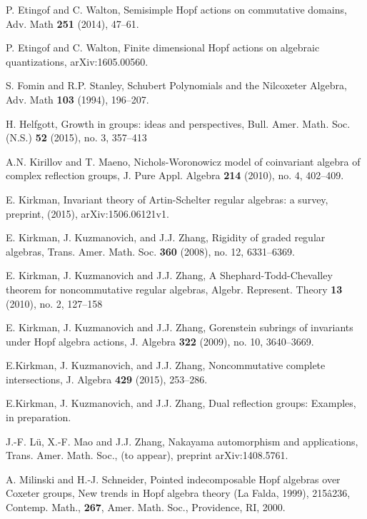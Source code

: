 \begin{thebibliography}{10}
P. Etingof and C. Walton, 
Semisimple Hopf actions on commutative domains, 
Adv. Math {\bf 251} (2014), 47--61.

P. Etingof and C. Walton, 
Finite dimensional Hopf actions on algebraic quantizations,
arXiv:1605.00560.

S. Fomin and R.P. Stanley, 
Schubert Polynomials and the Nilcoxeter Algebra,
Adv. Math {\bf 103} (1994), 196--207.

H. Helfgott, Growth in groups: ideas and perspectives,
Bull. Amer. Math. Soc. (N.S.) {\bf 52} (2015), no. 3, 357--413

A.N. Kirillov and T. Maeno, 
Nichols-Woronowicz model of coinvariant algebra of complex reflection groups, 
J. Pure Appl. Algebra  {\bf 214}  (2010),  no. 4, 402--409. 

E. Kirkman, Invariant theory of Artin-Schelter regular algebras: 
a survey, preprint, (2015), arXiv:1506.06121v1.

 E. Kirkman, J. Kuzmanovich, and J.J. Zhang,
Rigidity of graded regular algebras,
Trans. Amer. Math. Soc. {\bf 360} (2008), no. 12, 6331--6369.

E. Kirkman, J. Kuzmanovich and J.J. Zhang, A
Shephard-Todd-Chevalley theorem for noncommutative regular
algebras, Algebr. Represent. Theory {\bf 13} (2010), no. 2, 127--158

E. Kirkman, J. Kuzmanovich and J.J. Zhang, Gorenstein subrings of invariants
under Hopf algebra actions, J. Algebra {\bf 322} (2009), no. 10, 3640--3669.

E.Kirkman, J. Kuzmanovich, and J.J. Zhang,
Noncommutative complete intersections,  
J. Algebra {\bf 429} (2015), 253--286.

E.Kirkman, J. Kuzmanovich, and J.J. Zhang,
Dual reflection groups: Examples, in preparation.

J.-F. L\"u, X.-F. Mao and J.J. Zhang, 
Nakayama automorphism and applications, 
Trans. Amer. Math. Soc., (to appear), preprint
arXiv:1408.5761.

A. Milinski and H.-J. Schneider, 
Pointed indecomposable Hopf algebras over Coxeter groups, 
New trends in Hopf algebra theory (La Falda, 1999),  215â236, 
Contemp. Math., {\bf 267}, Amer. Math. Soc., Providence, RI, 2000. 

 


\end{thebibliography}
